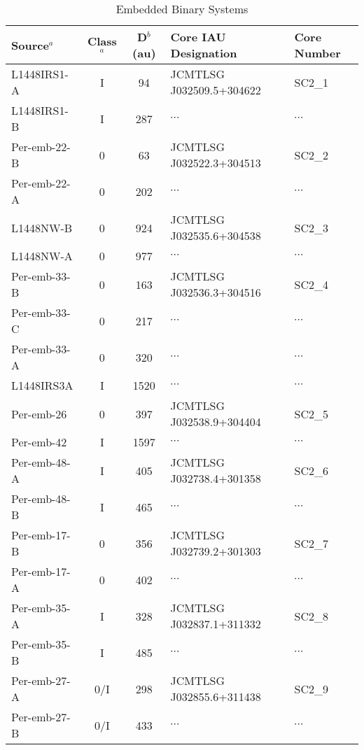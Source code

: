 \documentclass[usenatbib,a4paper]{mnras}
\begin{document}
{\setlength{\extrarowheight}{0.4pt}%
\begin{table*}
\renewcommand{\TPTminimum}{\linewidth}
\caption{Embedded Binary Systems}\label{coreBinary}
\begin{threeparttable}
\begin{tabular}{lccll}
\hline\hline
Source$^{a}$	& Class$^{a}$	&  D$^{b}$ (au)	& Core IAU Designation	&  Core Number \\
\hline
L1448IRS1-A 		& I 		& 94 		& JCMTLSG J032509.5+304622	& SC2\_1 	  \\
L1448IRS1-B 		& I 		& 287 	& $\cdots$ & $\cdots$ 		\\
\hline
Per-emb-22-B 		& 0 		& 63	 	& JCMTLSG J032522.3+304513 	& SC2\_2 	 \\
Per-emb-22-A 		& 0 		& 202	& $\cdots$ & $\cdots$ 		 \\
\hline
L1448NW-B 		& 0 		& 924 	& JCMTLSG J032535.6+304538 	& SC2\_3 	 \\
L1448NW-A 		& 0 		& 977 	& $\cdots$ & $\cdots$ 		 \\
\hline
Per-emb-33-B 		& 0 		& 163 	& JCMTLSG J032536.3+304516 	& SC2\_4 	 \\
Per-emb-33-C 		& 0 		& 217 	& $\cdots$ & $\cdots$ 		 \\
Per-emb-33-A 		& 0 		& 320 	& $\cdots$ & $\cdots$ 		\\
L1448IRS3A 		& I 		& 1520 	& $\cdots$ & $\cdots$ 		 \\
\hline
Per-emb-26 		& 0 		& 397 	& JCMTLSG J032538.9+304404 	& SC2\_5 	 \\
Per-emb-42 		& I 		& 1597 	& $\cdots$ & $\cdots$ 		 \\
\hline
Per-emb-48-A 		& I 		& 405 	& JCMTLSG J032738.4+301358 	& SC2\_6 	 \\
Per-emb-48-B 		& I 		& 465 	& $\cdots$ & $\cdots$ 		 \\
\hline
Per-emb-17-B		& 0 		& 356 	& JCMTLSG J032739.2+301303 	& SC2\_7 	 \\
Per-emb-17-A 		& 0 		& 402 	& $\cdots$ & $\cdots$ 		 \\
\hline
Per-emb-35-A 		& I 		& 328 	& JCMTLSG J032837.1+311332 	& SC2\_8 	 \\
Per-emb-35-B 		& I 		& 485 	& $\cdots$ & $\cdots$ 		 \\
\hline
Per-emb-27-A 		& 0/I 		& 298 	& JCMTLSG J032855.6+311438 	& SC2\_9 	 \\
Per-emb-27-B 		& 0/I 		& 433 	& $\cdots$ & $\cdots$ 		 \\

\end{tabular}
\end{threeparttable}
\end{table*}}
\end{document}
